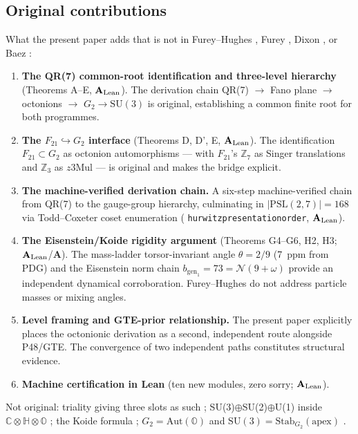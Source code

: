 \documentclass[11pt]{article}
\theoremstyle{remark}
\newcommand{\lean}[1]{%
  \penalty-100
  \begingroup\def\_{\textunderscore\allowbreak}\texttt{#1}\endgroup}
\newcommand{\CatA}{\textbf{A}}
\newcommand{\CatAL}{\ensuremath{\textbf{A}_{\rm Lean}}}
\begin{document}
\subsection{Original contributions}

What the present paper adds that is not in Furey--Hughes \cite{FureyHughes2025},
Furey \cite{Furey2015,Furey2016thesis,Furey2018},
Dixon \cite{Dixon1994}, or Baez \cite{Baez2002}:

\begin{enumerate}[noitemsep]
  \item \textbf{The QR(7) common-root identification and three-level hierarchy}
        (Theorems A--E, \CatAL).
        The derivation chain QR(7) $\to$ Fano plane $\to$ octonions $\to$
        $G_2\to\mathrm{SU}(3)$ is original, establishing a common finite root
        for both programmes.
  \item \textbf{The $F_{21}\hookrightarrow G_2$ interface} (Theorems D, D', E, \CatAL).
        The identification $F_{21}\subset G_2$ as octonion automorphisms --- with
        $F_{21}$'s $\mathbb{Z}_7$ as Singer translations and $\mathbb{Z}_3$ as
        $z3\mathrm{Mul}$ --- is original and makes the bridge explicit.
  \item \textbf{The machine-verified derivation chain.}
        A six-step machine-verified chain from QR(7) to the gauge-group hierarchy,
        culminating in $|\mathrm{PSL}(2,7)| = 168$ via Todd--Coxeter coset
        enumeration (\lean{hurwitz\_presentation\_order\_168}, \CatAL).
  \item \textbf{The Eisenstein/Koide rigidity argument}
        (Theorems G4--G6, H2, H3; \CatAL/\CatA).
        The mass-ladder torsor-invariant angle $\theta = 2/9$ (7~ppm from PDG)
        and the Eisenstein norm chain $b_{\mathrm{gen}_1} = 73 = \mathcal{N}(9+\omega)$
        provide an independent dynamical corroboration.
        Furey--Hughes do not address particle masses or mixing angles.
  \item \textbf{Level framing and GTE-prior relationship.}
        The present paper explicitly places the octonionic derivation as a second,
        independent route alongside P48/GTE. The convergence of two independent
        paths constitutes structural evidence.
  \item \textbf{Machine certification in Lean}
        (ten new modules, zero sorry; \CatAL).
\end{enumerate}

Not original: triality giving three slots as such \cite{FureyHughes2025};
SU(3)$\oplus$SU(2)$\oplus$U(1) inside $\mathbb{C}\otimes\mathbb{H}\otimes\mathbb{O}$
\cite{Furey2015,Furey2018,Dixon1994}; the Koide formula \cite{Koide1983};
$G_2 = \mathrm{Aut}(\mathbb{O})$ and $\mathrm{SU}(3) = \mathrm{Stab}_{G_2}(\mathrm{apex})$
\cite{GunaydinGursey1973}.
\end{document}
